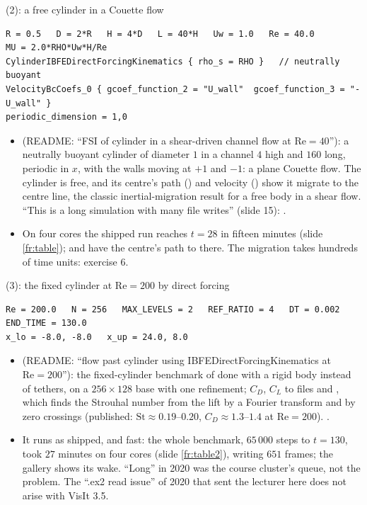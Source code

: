 \documentclass[aspectratio=169,11pt]{beamer}
\begin{document}
\begin{frame}[fragile]{ (2): a free cylinder in a Couette flow}
\label{fr:ex10}
\footnotesize
\begin{lstlisting}[style=inputtiny]
R = 0.5   D = 2*R   H = 4*D   L = 40*H   Uw = 1.0   Re = 40.0
MU = 2.0*RHO*Uw*H/Re
CylinderIBFEDirectForcingKinematics { rho_s = RHO }   // neutrally buoyant
VelocityBcCoefs_0 { gcoef_function_2 = "U_wall"  gcoef_function_3 = "-U_wall" }
periodic_dimension = 1,0
\end{lstlisting}
\begin{itemize}
  \item {} (README: ``FSI of cylinder in a shear-driven channel flow at $\mathrm{Re} = 40$''): a neutrally buoyant cylinder of diameter $1$ in a channel $4$ high and $160$ long, periodic in $x$, with the walls moving at $+1$ and $-1$: a plane Couette flow. The cylinder is free, and its centre's path () and velocity () show it migrate to the centre line, the classic inertial-migration result for a free body in a shear flow. ``This is a long simulation with many file writes'' (slide 15): .
  \item {} On four cores the shipped run reaches $t = 28$ in fifteen minutes (slide \ref{fr:table});  and  have the centre's path to there. The migration takes hundreds of time units: exercise 6.
\end{itemize}
\end{frame}

\begin{frame}[fragile]{ (3): the fixed cylinder at $\mathrm{Re} = 200$ by direct forcing}
\label{fr:ex11}
\footnotesize
\begin{lstlisting}[style=inputtiny]
Re = 200.0   N = 256   MAX_LEVELS = 2   REF_RATIO = 4   DT = 0.002   END_TIME = 130.0
x_lo = -8.0, -8.0   x_up = 24.0, 8.0
\end{lstlisting}
\begin{itemize}
  \item {} (README: ``flow past cylinder using IBFEDirectForcingKinematics at $\mathrm{Re} = 200$''): the fixed-cylinder benchmark of  done with a rigid body instead of tethers, on a $256\times128$ base with one refinement; $C_D$, $C_L$ to  files and , which finds the Strouhal number from the lift by a Fourier transform and by zero crossings (published: $\mathrm{St} \approx 0.19$--$0.20$, $C_D \approx 1.3$--$1.4$ at $\mathrm{Re} = 200$). .
  \item {} It runs as shipped, and fast: the whole benchmark, $65\,000$ steps to $t = 130$, took $27$ minutes on four cores (slide \ref{fr:table2}), writing $651$ frames; the gallery shows its wake. ``Long'' in 2020 was the course cluster's queue, not the problem. The  ``.ex2 read issue'' of 2020 that sent the lecturer here does not arise with VisIt 3.5.
\end{itemize}
\end{frame}
\end{document}
